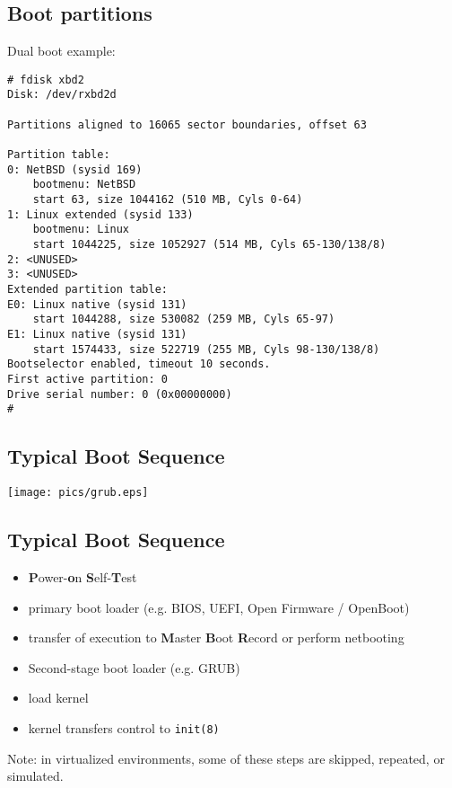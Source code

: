 \documentclass[xga]{xdvislides}
\begin{document}
\subsection{Boot partitions}
Dual boot example:
\smallish
\begin{verbatim}
# fdisk xbd2
Disk: /dev/rxbd2d

Partitions aligned to 16065 sector boundaries, offset 63

Partition table:
0: NetBSD (sysid 169)
    bootmenu: NetBSD
    start 63, size 1044162 (510 MB, Cyls 0-64)
1: Linux extended (sysid 133)
    bootmenu: Linux
    start 1044225, size 1052927 (514 MB, Cyls 65-130/138/8)
2: <UNUSED>
3: <UNUSED>
Extended partition table:
E0: Linux native (sysid 131)
    start 1044288, size 530082 (259 MB, Cyls 65-97)
E1: Linux native (sysid 131)
    start 1574433, size 522719 (255 MB, Cyls 98-130/138/8)
Bootselector enabled, timeout 10 seconds.
First active partition: 0
Drive serial number: 0 (0x00000000)
# 
\end{verbatim}
\Normalsize

\subsection{Typical Boot Sequence}
\vspace*{\fill}
\begin{center}
	\texttt{[image: pics/grub.eps]} \\
\end{center}
\vspace*{\fill}

\subsection{Typical Boot Sequence}
\begin{itemize}
	\item {\bf P}ower-{\bf o}n {\bf S}elf-{\bf T}est
	\item primary boot loader (e.g. BIOS, UEFI, Open Firmware / OpenBoot)
	\item transfer of execution to {\bf M}aster {\bf B}oot {\bf R}ecord or perform netbooting
	\item Second-stage boot loader (e.g. GRUB)
	\item load kernel
	\item kernel transfers control to {\tt init(8)}
\end{itemize}
\vspace{.5in}
Note: in virtualized environments, some of these steps
are skipped, repeated, or simulated. \\
\end{document}
